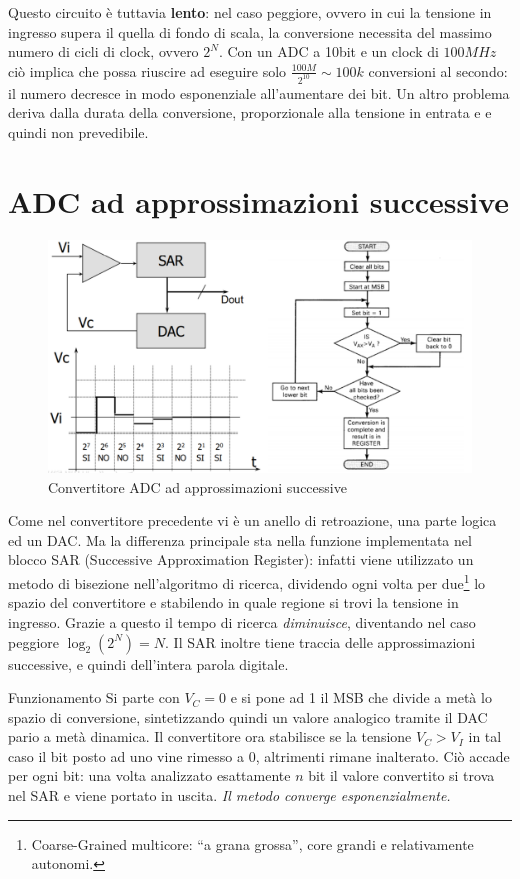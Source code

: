 \documentclass[
]{book}
\begin{document}
Questo circuito è tuttavia \textbf{lento}: nel caso peggiore, ovvero in
cui la tensione in ingresso supera il quella di fondo di scala, la
conversione necessita del massimo numero di cicli di clock, ovvero
\(2^{N}\). Con un ADC a 10bit e un clock di \(100MHz\) ciò implica che
possa riuscire ad eseguire solo \(\frac{100M}{2^{10}}\sim 100k\)
conversioni al secondo: il numero decresce in modo esponenziale
all'aumentare dei bit. \newline Un altro problema deriva dalla durata
della conversione, proporzionale alla tensione in entrata e e quindi non
prevedibile.

\section{ADC ad approssimazioni
successive}\label{adc-ad-approssimazioni-successive}

\begin{figure}
\centering
\includegraphics[width=0.5\linewidth,height=\textheight,keepaspectratio]{immagini/44.png}
\caption{Convertitore ADC ad approssimazioni successive}
\end{figure}

Come nel convertitore precedente vi è un anello di retroazione, una
parte logica ed un DAC. Ma la differenza principale sta nella funzione
implementata nel blocco SAR (Successive Approximation Register): infatti
viene utilizzato un metodo di bisezione nell'algoritmo di ricerca,
dividendo ogni volta per due\footnote{Coarse-Grained multicore: ``a
  grana grossa'', core grandi e relativamente autonomi.} lo spazio del
convertitore e stabilendo in quale regione si trovi la tensione in
ingresso. Grazie a questo il tempo di ricerca \emph{diminuisce},
diventando nel caso peggiore \(\log_2(2^N)=N\). Il SAR inoltre tiene
traccia delle approssimazioni successive, e quindi dell'intera parola
digitale.

\begin{redbox}{Funzionamento}
Si parte con $V_C=0$ e si pone ad 1 il MSB che divide a metà lo spazio di conversione, sintetizzando quindi un valore analogico tramite il DAC pario a metà dinamica. Il convertitore ora stabilisce se la tensione $V_{C}>V_{I}$ in tal caso il bit posto ad uno vine rimesso a 0, altrimenti rimane inalterato.\newline
Ciò accade per ogni bit: una volta analizzato esattamente $n$ bit il valore convertito si trova nel SAR e viene portato in uscita.\newline
\emph{Il metodo converge esponenzialmente.}
\end{redbox}
\end{document}
